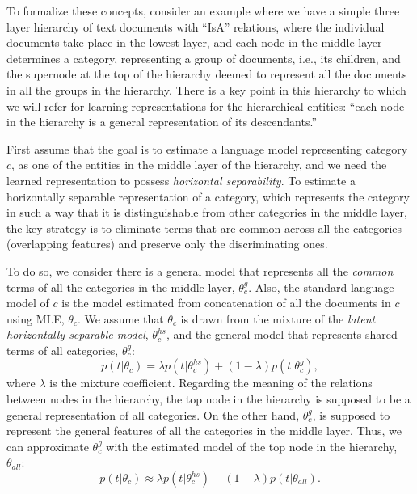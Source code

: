 To formalize these concepts, consider an example where we have a simple three layer hierarchy of text documents with ``IsA'' relations, where the individual documents take place in the lowest layer, and each node in the middle layer determines a category, representing a group of documents, i.e., its children, and the supernode at the top of the hierarchy deemed to represent all the documents in all the groups in the hierarchy. 
%
There is a key point in this hierarchy to which we will refer for learning representations for the hierarchical entities: ``each node in the hierarchy is a general representation of its descendants.''

First assume that the goal is to estimate a language model representing category $c$, as one of the entities in the middle layer of the hierarchy, and we need the learned representation to possess \emph{horizontal separability}. 
To estimate a horizontally separable representation of a category, which represents the category in such a way that it is distinguishable from other categories in the middle layer, the key strategy is to eliminate terms that are common across all the categories (overlapping features) and preserve only the discriminating ones.

To do so, we consider there is a general model that represents all the \emph{common} terms of all the categories in the middle layer, $\theta_c^{g}$. 
Also, the standard language model of $c$ is the model estimated from concatenation of all the documents in $c$ using MLE, $\theta_{c}$. 
We assume that $\theta_{c}$ is drawn from the mixture of the \emph{latent horizontally separable model}, $\theta_{c}^{hs}$, and the general model that represents shared terms of all categories, $\theta_c^{g}$:
\begin{equation}
p(t|\theta_{c})  =  \lambda p(t|\theta_{c}^{hs}) + (1-\lambda) p(t|\theta_c^g),
\end{equation}
%
where $\lambda$ is the mixture coefficient.
Regarding the meaning of the relations between nodes in the hierarchy, the top node in the hierarchy is supposed to be a general representation of all categories.
On the other hand, $\theta_c^{g}$, is supposed to represent the general features of all the categories in the middle layer. Thus, we can approximate $\theta_c^{g}$ with the estimated model of the top node in the hierarchy, $\theta_{all}$:
\begin{equation}
 p(t|\theta_c) \approx \lambda p(t|\theta_{c}^{hs}) + (1-\lambda) p(t|\theta_{all}).
 \label{mixture}
\end{equation}


